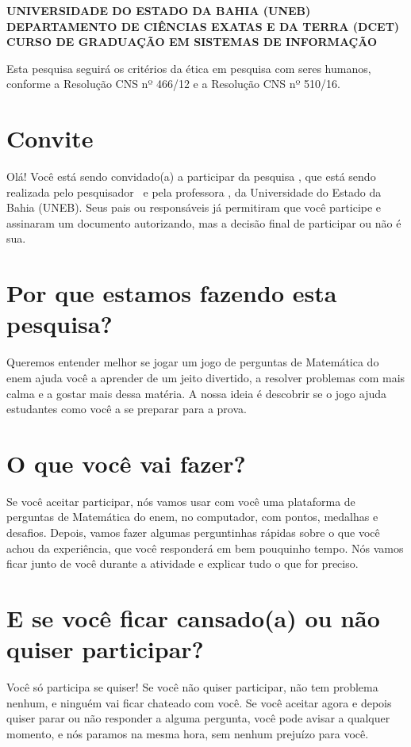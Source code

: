 \label{ap:tale}

\begin{center}
    \textbf{UNIVERSIDADE DO ESTADO DA BAHIA (UNEB)}\\[0.2cm]
    \textbf{DEPARTAMENTO DE CIÊNCIAS EXATAS E DA TERRA (DCET)}\\[0.2cm]
    \textbf{CURSO DE GRADUAÇÃO EM SISTEMAS DE INFORMAÇÃO}
\end{center}

\noindent Esta pesquisa seguirá os critérios da ética em pesquisa com seres humanos, conforme a Resolução CNS nº 466/12 e a Resolução CNS nº 510/16.

\section{Convite}
Olá! Você está sendo convidado(a) a participar da pesquisa \imprimirtitulo, que está sendo realizada pelo pesquisador \imprimirautor\ e pela professora \imprimirorientador, da Universidade do Estado da Bahia (UNEB). Seus pais ou responsáveis já permitiram que você participe e assinaram um documento autorizando, mas a decisão final de participar ou não é sua.

\section{Por que estamos fazendo esta pesquisa?}
Queremos entender melhor se jogar um jogo de perguntas de Matemática do \gls{enem} ajuda você a aprender de um jeito divertido, a resolver problemas com mais calma e a gostar mais dessa matéria. A nossa ideia é descobrir se o jogo ajuda estudantes como você a se preparar para a prova.

\section{O que você vai fazer?}
Se você aceitar participar, nós vamos usar com você uma plataforma de perguntas de Matemática do \gls{enem}, no computador, com pontos, medalhas e desafios. Depois, vamos fazer algumas perguntinhas rápidas sobre o que você achou da experiência, que você responderá em bem pouquinho tempo. Nós vamos ficar junto de você durante a atividade e explicar tudo o que for preciso.

\section{E se você ficar cansado(a) ou não quiser participar?}
Você só participa se quiser! Se você não quiser participar, não tem problema nenhum, e ninguém vai ficar chateado com você. Se você aceitar agora e depois quiser parar ou não responder a alguma pergunta, você pode avisar a qualquer momento, e nós paramos na mesma hora, sem nenhum prejuízo para você.


